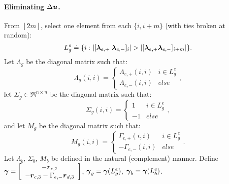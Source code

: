 \paragraph{Eliminating $\Delta \boldsymbol{u}$.}

From $[2m]$, select one element from each $\{ i, i+m\}$ (with ties broken at random):
$$L^e_g \doteq \{ i : | [\boldsymbol{\lambda}_{e,+} \; \boldsymbol{\lambda}_{e,-}]_i | > | [\boldsymbol{\lambda}_{e,+} \\ \boldsymbol{\lambda}_{e,-} ]_{i+m} | \}.$$
Let $\Lambda_g$ be the diagonal matrix such that:
$$\Lambda_g(i,i) = \left\{ \begin{array}{cc} \Lambda_{e,+}(i,i) & i \in L^e_g \\ \Lambda_{e,-}(i,i) & else \end{array}\right.,$$ 
let $\Sigma_g \in \Re^{n \times n}$ be the diagonal matrix such that:
$$\Sigma_g(i,i) = \left\{ \begin{array}{cc} 1 & i \in L^e_g \\ -1 & else \end{array}\right.,$$
and let $M_g$ be the diagonal matrix such that:
$$M_g(i,i) = \left\{ \begin{array}{cc} \Gamma_{e,+}(i,i) & i \in L^e_g \\ -\Gamma_{e,-}(i,i) & else \end{array}\right..$$ 
Let $\Lambda_b$, $\Sigma_b$, $M_b$ be defined in the natural (complement) manner. Define $\boldsymbol{\gamma} =  \left[ \begin{array}{c} - \boldsymbol{r}_{c,2} \\ -\boldsymbol{r}_{c,3} - \Gamma_{e,-} \boldsymbol{r}_{d,3} \end{array} \right]$, $\boldsymbol{\gamma}_g = \boldsymbol{\gamma}(L^e_g)$, $\boldsymbol{\gamma}_b = \boldsymbol{\gamma}(L^e_b)$.

